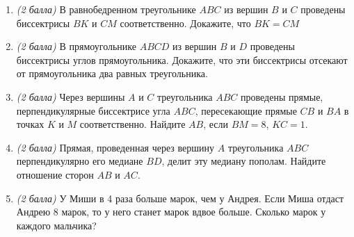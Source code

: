 \documentclass[12pt, a4paper]{article}
\begin{document}
		

\begin{enumerate}
	\item \textit{(2 балла)} В равнобедренном треугольнике $ABC$ из вершин $B$ и $C$ проведены биссектрисы $BK$ и $CM$ соответственно. Докажите, что $BK=CM$
	\item \textit{(2 балла)} В прямоугольнике $ABCD$ из вершин $B$ и $D$ проведены биссектрисы углов прямоугольника. Докажите, что эти биссектрисы отсекают от прямоугольника два равных треугольника.
	\item \textit{(2 балла)} Через вершины $A$ и $C$ треугольника $ABC$ проведены прямые, перпендикулярные биссектрисе угла $ABC$, пересекающие прямые $CB$ и $BA$ в точках $K$ и $M$ соответственно. Найдите $AB$, если $BM = 8$, $KC = 1$.
	\item \textit{(2 балла)} Прямая, проведенная через вершину $A$ треугольника $ABC$ перпендикулярно его медиане $BD$, делит эту медиану пополам. Найдите отношение сторон $AB$ и $AC$.
	\item \textit{(2 балла)} У Миши в 4 раза больше марок, чем у Андрея. Если Миша отдаст Андрею 8 марок, то у него станет марок вдвое больше. Сколько марок у каждого мальчика?
\end{enumerate}
\end{document}

